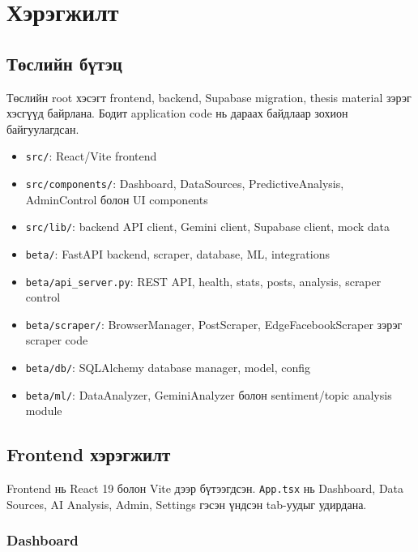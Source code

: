 \documentclass[
12pt,
oneside,
english,
onehalfspacing,
nolistspacing,
headsepline,
]{MUST-Thesis}
\begin{document}
\chapter{Хэрэгжилт}

\section{Төслийн бүтэц}

Төслийн root хэсэгт frontend, backend, Supabase migration, thesis material зэрэг хэсгүүд байрлана. Бодит application code нь дараах байдлаар зохион байгуулагдсан.

\begin{itemize}
    \item \texttt{src/}: React/Vite frontend
    \item \texttt{src/components/}: Dashboard, DataSources, PredictiveAnalysis, AdminControl болон UI components
    \item \texttt{src/lib/}: backend API client, Gemini client, Supabase client, mock data
    \item \texttt{beta/}: FastAPI backend, scraper, database, ML, integrations
    \item \texttt{beta/api\_server.py}: REST API, health, stats, posts, analysis, scraper control
    \item \texttt{beta/scraper/}: BrowserManager, PostScraper, EdgeFacebookScraper зэрэг scraper code
    \item \texttt{beta/db/}: SQLAlchemy database manager, model, config
    \item \texttt{beta/ml/}: DataAnalyzer, GeminiAnalyzer болон sentiment/topic analysis module
\end{itemize}

\section{Frontend хэрэгжилт}

Frontend нь React 19 болон Vite дээр бүтээгдсэн. \texttt{App.tsx} нь Dashboard, Data Sources, AI Analysis, Admin, Settings гэсэн үндсэн tab-уудыг удирдана.

\subsection{Dashboard}
\end{document}

